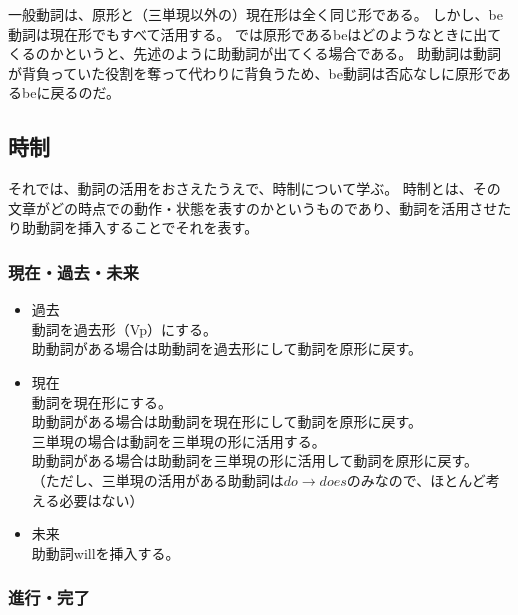 \documentclass[11pt,a4paper,titlepage]{jsarticle}
\begin{document}
一般動詞は、原形と（三単現以外の）現在形は全く同じ形である。
しかし、be動詞は現在形でもすべて活用する。
では原形であるbeはどのようなときに出てくるのかというと、先述のように助動詞が出てくる場合である。
助動詞は動詞が背負っていた役割を奪って代わりに背負うため、be動詞は否応なしに原形であるbeに戻るのだ。

\subsection{時制}

それでは、動詞の活用をおさえたうえで、時制について学ぶ。
時制とは、その文章がどの時点での動作・状態を表すのかというものであり、動詞を活用させたり助動詞を挿入することでそれを表す。

\subsubsection{現在・過去・未来}

\begin{itemize}
  \item 過去\\
  動詞を過去形（Vp）にする。\\
  助動詞がある場合は助動詞を過去形にして動詞を原形に戻す。
  \item 現在\\
  動詞を現在形にする。\\
  助動詞がある場合は助動詞を現在形にして動詞を原形に戻す。\\
  三単現の場合は動詞を三単現の形に活用する。\\
  助動詞がある場合は助動詞を三単現の形に活用して動詞を原形に戻す。\\
  （ただし、三単現の活用がある助動詞は$do \rightarrow does$のみなので、ほとんど考える必要はない）
  \item 未来\\
  助動詞willを挿入する。
\end{itemize}

\subsubsection{進行・完了}
\end{document}
